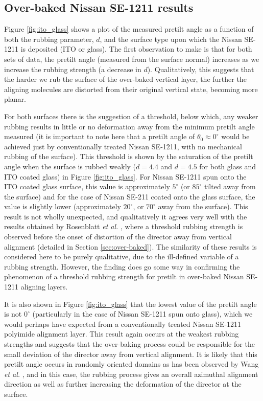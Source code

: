 \subsection{Over-baked Nissan SE-1211 results}
\label{sec:1211_results}
Figure \ref{fig:ito_glass} shows a plot of the measured pretilt angle as a function of both the rubbing parameter, $d$, and the surface type upon which the Nissan SE-1211 is deposited (ITO or glass). The first observation to make is that for both sets of data, the pretilt angle (measured from the surface normal) increases as we increase the rubbing strength (a decrease in $d$). Qualitatively, this suggests that the harder we rub the surface of the over-baked vertical layer, the further the aligning molecules are distorted from their original vertical state, becoming more planar.

For both surfaces there is the suggestion of a threshold, below which, any weaker rubbing results in little or no deformation away from the minimum pretilt angle measured (it is important to note here that a pretilt angle of $\theta_0\approx0^{\circ}$ would be achieved just by conventionally treated Nissan SE-1211, with no mechanical rubbing of the surface). This threshold is shown by the saturation of the pretilt angle when the surface is rubbed weakly ($d=4.4$ and $d=4.5$ for both glass and ITO coated glass) in Figure \ref{fig:ito_glass}. For Nissan SE-1211 spun onto the ITO coated glass surface, this value is approximately $5^{\circ}$ (or $85^{\circ}$ tilted away from the surface) and for the case of Nissan SE-211 coated onto the glass surface, the value is slightly lower (approximately $20^{\circ}$, or $70^{\circ}$ away from the surface). This result is not wholly unexpected, and qualitatively it agrees very well with the results obtained by Rosenblatt \textit{et al.} \cite{Huang2005}, where a threshold rubbing strength is observed before the onset of distortion of the director away from vertical alignment (detailed in Section \ref{sec:over-baked}). The similarity of these results is considered here to be purely qualitative, due to the ill-defined variable of a rubbing strength. However, the finding does go some way in confirming the phenomenon of a threshold rubbing strength for pretilt in over-baked Nissan SE-1211 aligning layers.

It is also shown in Figure \ref{fig:ito_glass} that the lowest value of the pretilt angle is not $0^{\circ}$ (particularly in the case of Nissan SE-1211 spun onto glass), which we would perhaps have expected from a conventionally treated Nissan SE-1211 polyimide alignment layer. This result again occurs at the weakest rubbing strengths and suggests that the over-baking process could be responsible for the small deviation of the director away from vertical alignment. It is likely that this pretilt angle occurs in randomly oriented domains as has been observed by Wang \textsl{et al.} \cite{Wang2007}, and in this case, the rubbing process gives an overall azimuthal alignment direction as well as further increasing the deformation of the director at the surface.

